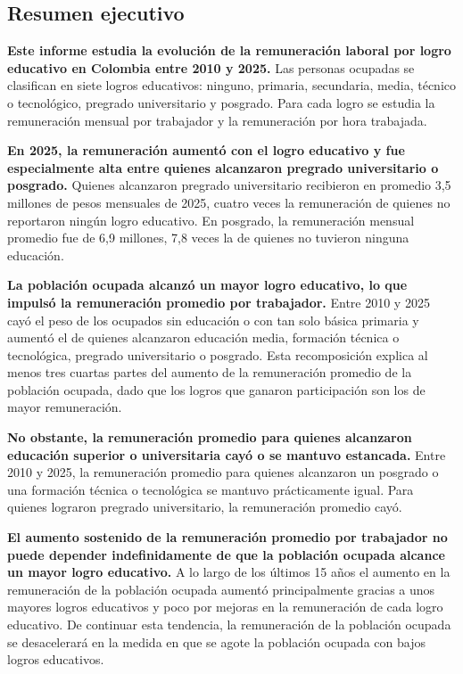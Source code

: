 \documentclass[12pt, a4paper]{article}
\begin{document}
\begin{mdframed}[
  linewidth=1pt,
  linecolor=gray!60,
  backgroundcolor=gray!6,
  innertopmargin=12pt,
  innerbottommargin=12pt,
  innerleftmargin=14pt,
  innerrightmargin=14pt
]
\section*{Resumen ejecutivo}
\textbf{Este informe estudia la evolución de la remuneración laboral por logro educativo en Colombia entre 2010 y 2025.} Las personas ocupadas se clasifican en siete logros educativos: ninguno, primaria, secundaria, media, técnico o tecnológico, pregrado universitario y posgrado. Para cada logro se estudia la remuneración mensual por trabajador y la remuneración por hora trabajada.

\textbf{En 2025, la remuneración aumentó con el logro educativo y fue especialmente alta entre quienes alcanzaron pregrado universitario o posgrado.} Quienes alcanzaron pregrado universitario recibieron en promedio 3,5 millones de pesos mensuales de 2025, cuatro veces la remuneración de quienes no reportaron ningún logro educativo. En posgrado, la remuneración mensual promedio fue de 6,9 millones, 7,8 veces la de quienes no tuvieron ninguna educación. %

\textbf{La población ocupada alcanzó un mayor logro educativo, lo que impulsó la remuneración promedio por trabajador.} Entre 2010 y 2025 cayó el peso de los ocupados sin educación o con tan solo básica primaria y aumentó el de quienes alcanzaron educación media, formación técnica o tecnológica, pregrado universitario o posgrado. Esta recomposición explica al menos tres cuartas partes del aumento de la remuneración promedio de la población ocupada, dado que los logros que ganaron participación son los de mayor remuneración.

\textbf{No obstante, la remuneración promedio para quienes alcanzaron educación superior o universitaria cayó o se mantuvo estancada.} Entre 2010 y 2025, la remuneración promedio para quienes alcanzaron un posgrado o una formación técnica o tecnológica se mantuvo prácticamente igual. Para quienes lograron pregrado universitario, la remuneración promedio cayó. 


\textbf{El aumento sostenido de la remuneración promedio por trabajador no puede depender indefinidamente de que la población ocupada alcance un mayor logro educativo.} A lo largo de los últimos 15 años el aumento en la remuneración de la población ocupada aumentó principalmente gracias a unos mayores logros educativos y poco por mejoras en la remuneración de cada logro educativo. De continuar esta tendencia, la remuneración de la población ocupada se desacelerará en la medida en que se agote la población ocupada con bajos logros educativos.
\end{mdframed}

\newpage
\tableofcontents
\newpage


\end{document}
